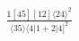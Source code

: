\documentclass[varwidth, border=5pt]{standalone}
\begin{document}
\begin{my}
$\begin{gathered}
\scriptscriptstyle\frac{1[45][12]⟨24⟩^2}{⟨35⟩⟨4|1+2|4]^2}
\end{gathered}$
\end{my}
\end{document}
